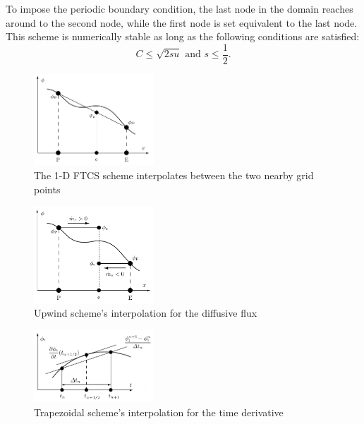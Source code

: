 \documentclass[twocolumn,10pt]{asme2ej}
\begin{document}
\noindent To impose the periodic boundary condition, the last node in the domain reaches around to the second node, while the first node is set equivalent to the last node. This scheme is numerically stable as long as the following conditions are satisfied:
\begin{equation}
\label{FTCS_stability}
C \leq \sqrt{2su} \mbox{ and } s \leq \frac{1}{2}.
\end{equation}

\begin{figure}[t]
\begin{center}
\includegraphics[width=0.4\textwidth]{figure/FTCS.png}
\caption{The 1-D FTCS scheme interpolates between the two nearby grid points \cite{analytic_citation}}
\label{FTCS_scheme}
\end{center}
\end{figure}

\begin{figure}[t]
\begin{center}
\includegraphics[width=0.4\textwidth]{figure/Upwind.png}
\caption{Upwind scheme's interpolation for the diffusive flux \cite{analytic_citation}}
\label{Upwind_scheme}
\end{center}
\end{figure}

\begin{figure}[t]
\begin{center}
\includegraphics[width=0.4\textwidth]{figure/Trapezoidal (time derivative).png}
\caption{Trapezoidal scheme's interpolation for the time derivative \cite{analytic_citation}}
\label{Trapezoidal_scheme}
\end{center}
\end{figure}
\end{document}
